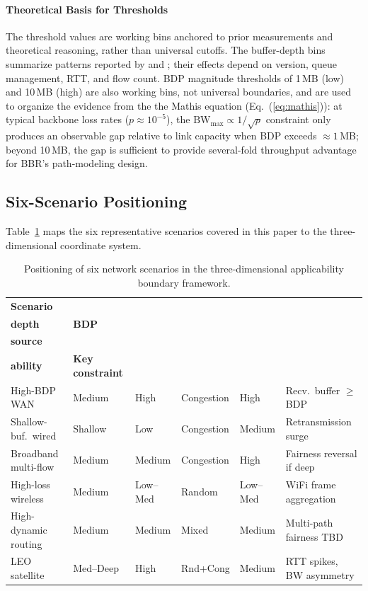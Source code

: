 \documentclass[a4paper,fleqn]{cas-sc}
\begin{document}
\paragraph{Theoretical Basis for Thresholds}
The threshold values are working bins anchored to prior measurements and
theoretical reasoning, rather than universal cutoffs. The buffer-depth bins
summarize patterns reported by \citet{cao2019bbr} and \citet{jaeger2019bbr};
their effects depend on version, queue management, RTT, and flow count. BDP
magnitude thresholds of 1\,MB (low) and 10\,MB (high) are also working bins,
not universal boundaries, and are used to organize the evidence from the
the Mathis equation (Eq.~(\ref{eq:mathis})): at typical backbone loss rates
($p\approx10^{-5}$), the $\mathrm{BW}_{\max}\propto 1/\sqrt{p}$ constraint only
produces an observable gap relative to link capacity when BDP exceeds
$\approx1$\,MB; beyond 10\,MB, the gap is sufficient to provide several-fold
throughput advantage for BBR's path-modeling design.

\subsection{Six-Scenario Positioning}
\label{sec:framework_pos}

Table~\ref{tab:framework} maps the six representative scenarios covered in this
paper to the three-dimensional coordinate system.

\begin{table}[pos=tbp]
  \caption{Positioning of six network scenarios in the three-dimensional
    applicability boundary framework.}
  \label{tab:framework}
  \small
  \begin{tabularx}{\tblwidth}{@{}p{2.1cm}p{1.3cm}p{1.2cm}p{1.5cm}p{1.6cm}X@{}}
    \toprule
    \textbf{Scenario} & \makecell[l]{\textbf{Buffer}\\\textbf{depth}} & \textbf{BDP}
      & \makecell[l]{\textbf{Loss}\\\textbf{source}} & \makecell[l]{\textbf{Suit-}\\\textbf{ability}}
      & \textbf{Key constraint} \\
    \midrule
    High-BDP WAN & Medium & High & Congestion & High & Recv.\ buffer $\geq$ BDP \\
    Shallow-buf.\ wired & Shallow & Low & Congestion & Medium & Retransmission surge \\
    Broadband multi-flow & Medium & Medium & Congestion & High & Fairness reversal if deep \\
    High-loss wireless & Medium & Low--Med & Random & Low--Med & WiFi frame aggregation \\
    High-dynamic routing & Medium & Medium & Mixed & Medium & Multi-path fairness TBD \\
    LEO satellite & Med--Deep & High & Rnd+Cong & Medium & RTT spikes, BW asymmetry \\
    \bottomrule
  \end{tabularx}
\end{table}
\end{document}
